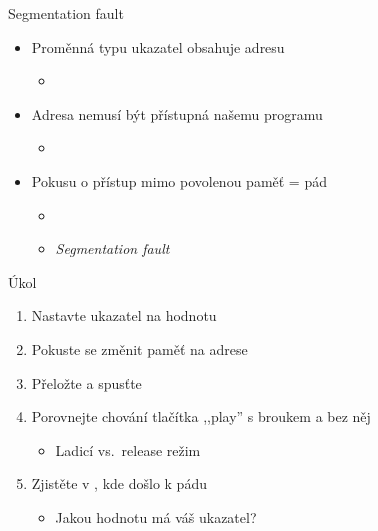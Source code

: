 \begin{frame}{Segmentation fault}

  \begin{itemize}
    \item Proměnná typu ukazatel obsahuje adresu
    \begin{itemize}
      \item {}
    \end{itemize}

    \pause

    \item Adresa nemusí být přístupná našemu programu
    \begin{itemize}
      \item {}
    \end{itemize}

    \pause

    \item Pokusu o přístup mimo povolenou paměť = pád
    \begin{itemize}
      \item {}
      \item \emph{Segmentation fault}
    \end{itemize}
  \end{itemize}

\end{frame}

\begin{frame}{Úkol}

  \begin{enumerate}
    \item Nastavte ukazatel na hodnotu 
    \item Pokuste se změnit paměť na adrese 
    \item Přeložte a spusťte
    \item Porovnejte chování tlačítka ,,play'' s broukem a bez něj
    \begin{itemize}
      \item Ladicí vs.\ release režim
    \end{itemize}
    \item Zjistěte v \qtcu, kde došlo k pádu
    \begin{itemize}
      \item Jakou hodnotu má váš ukazatel?
    \end{itemize}
  \end{enumerate}

\end{frame}

